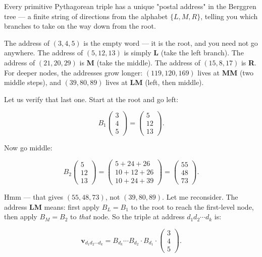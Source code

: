 \documentclass[11pt,openright,twoside]{book}
\theoremstyle{definition}
\begin{document}
Every primitive Pythagorean triple has a unique "postal address" in the Berggren tree --- a finite string of directions from the alphabet $\{L, M, R\}$, telling you which branches to take on the way down from the root.

The address of $(3, 4, 5)$ is the empty word --- it is the root, and you need not go anywhere. The address of $(5, 12, 13)$ is simply \textbf{L} (take the left branch). The address of $(21, 20, 29)$ is \textbf{M} (take the middle). The address of $(15, 8, 17)$ is \textbf{R}. For deeper nodes, the addresses grow longer: $(119, 120, 169)$ lives at \textbf{MM} (two middle steps), and $(39, 80, 89)$ lives at \textbf{LM} (left, then middle).

Let us verify that last one. Start at the root and go left:

\[B_1 \begin{pmatrix} 3 \\ 4 \\ 5 \end{pmatrix} = \begin{pmatrix} 5 \\ 12 \\ 13 \end{pmatrix}.\]

Now go middle:

\[B_2 \begin{pmatrix} 5 \\ 12 \\ 13 \end{pmatrix} = \begin{pmatrix} 5 + 24 + 26 \\ 10 + 12 + 26 \\ 10 + 24 + 39 \end{pmatrix} = \begin{pmatrix} 55 \\ 48 \\ 73 \end{pmatrix}.\]

Hmm --- that gives $(55, 48, 73)$, not $(39, 80, 89)$. Let me reconsider. The address \textbf{LM} means: first apply $B_L = B_1$ to the root to reach the first-level node, then apply $B_M = B_2$ to \textit{that} node. So the triple at address $d_1 d_2 \cdots d_k$ is:

\[\mathbf{v}_{d_1 d_2 \cdots d_k} = B_{d_k} \cdots B_{d_2} \cdot B_{d_1} \cdot \begin{pmatrix} 3 \\ 4 \\ 5 \end{pmatrix}.\]
\end{document}
